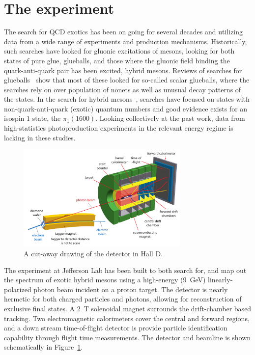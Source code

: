\section[The \gx{} experiment (Curtis)]{\label{sec:gluexexperiment} The \gx{} experiment}
The search for QCD exotics has been on going for several decades and utilizing data from a wide range of experiments and production mechanisms. Historically, such searches have looked for gluonic excitations of mesons, looking for both states of pure glue, glueballs, and those where the gluonic field binding the quark-anti-quark pair has been excited, hybrid mesons. Reviews of searches for glueballs~\cite{Crede:2008vw} show that most of these looked for so-called scalar glueballs, where the searches rely on over population of nonets as well as unusual decay patterns of the states. In the search for hybrid mesons~\cite{Meyer:2010ku,Meyer:2015eta}, searches have focused on states with non-quark-anti-quark (exotic) quantum numbers and good evidence exists for an isospin $1$ state, the $\pi_{1}(1600)$. Looking collectively at the past work, data from high-statistics photoproduction experiments in the relevant energy regime is lacking in these studies. 

\begin{figure}[h!]\centering
\includegraphics[width=0.75\textwidth]{figures/detector_beamline_noplug_noGlueX.pdf}
\caption[]{\label{fig:gluex_cut-away}A cut-away drawing of the \GX{} detector in Hall D.}
\end{figure}
The \gx{} experiment at Jefferson Lab has been built to both search for, and map out the spectrum of exotic hybrid mesons using a high-energy (9~GeV) linearly-polarized photon beam incident on a proton target\cite{gluex-ref}. The detector is nearly hermetic for both charged particles and photons, allowing for reconstruction of exclusive final states. A 2~T solenoidal magnet surrounds the drift-chamber based tracking. Two electromagnetic calorimeters cover the central and forward regions, and a down stream time-of-flight detector is provide particle identification capability through flight time measurements. The \gx{} detector and beamline is shown schematically in Figure~\ref{fig:gluex_cut-away}.


